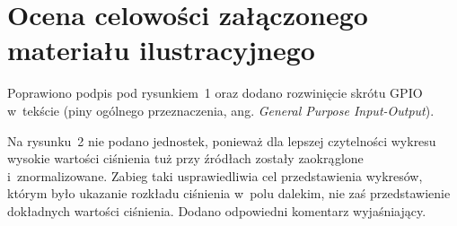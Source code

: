 \documentclass[12pt]{article}
\begin{document}
\section{Ocena celowości załączonego materiału ilustracyjnego}

Poprawiono podpis pod rysunkiem~1 oraz dodano rozwinięcie skrótu GPIO w~tekście
(piny ogólnego przeznaczenia, ang. \textit{General Purpose Input-Output}).

Na rysunku~2 nie podano jednostek, ponieważ dla lepszej czytelności wykresu
wysokie wartości ciśnienia tuż przy źródłach zostały zaokrąglone i~znormalizowane. Zabieg taki usprawiedliwia cel przedstawienia wykresów,
którym było ukazanie rozkładu ciśnienia w~polu dalekim, nie zaś przedstawienie
dokładnych wartości ciśnienia. Dodano odpowiedni komentarz wyjaśniający.

%
%
%
%
\end{document}
